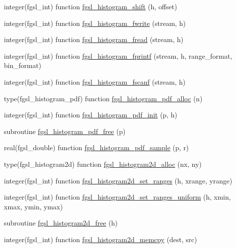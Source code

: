 \begin{DoxyCompactItemize}
\item 
integer(fgsl\+\_\+int) function \hyperlink{histogram_8finc_a9be390cc9127a6ad9c43f1174f6921a3}{fgsl\+\_\+histogram\+\_\+shift} (h, offset)
\item 
integer(fgsl\+\_\+int) function \hyperlink{histogram_8finc_a9cd60d2b4a8975dbc59173525df57213}{fgsl\+\_\+histogram\+\_\+fwrite} (stream, h)
\item 
integer(fgsl\+\_\+int) function \hyperlink{histogram_8finc_ad4d6685a3377f33f0d5696e20d567c11}{fgsl\+\_\+histogram\+\_\+fread} (stream, h)
\item 
integer(fgsl\+\_\+int) function \hyperlink{histogram_8finc_ac04324f86720d5a8fb31ff67add1b52e}{fgsl\+\_\+histogram\+\_\+fprintf} (stream, h, range\+\_\+format, bin\+\_\+format)
\item 
integer(fgsl\+\_\+int) function \hyperlink{histogram_8finc_aaaba1318d1c622c34f72afd75f57255c}{fgsl\+\_\+histogram\+\_\+fscanf} (stream, h)
\item 
type(fgsl\+\_\+histogram\+\_\+pdf) function \hyperlink{histogram_8finc_ac81a0323bfb973e3f0e8bd98c3acf6b8}{fgsl\+\_\+histogram\+\_\+pdf\+\_\+alloc} (n)
\item 
integer(fgsl\+\_\+int) function \hyperlink{histogram_8finc_a49d1a7fc4dec06f53bb7251385c14d0f}{fgsl\+\_\+histogram\+\_\+pdf\+\_\+init} (p, h)
\item 
subroutine \hyperlink{histogram_8finc_afcdb14cb3224ee516b50ecee1d2bc9af}{fgsl\+\_\+histogram\+\_\+pdf\+\_\+free} (p)
\item 
real(fgsl\+\_\+double) function \hyperlink{histogram_8finc_a6bfe5e29af3597cf776cc60d40950dbe}{fgsl\+\_\+histogram\+\_\+pdf\+\_\+sample} (p, r)
\item 
type(fgsl\+\_\+histogram2d) function \hyperlink{histogram_8finc_a58fa9efe4e0dd763ec4dae80d32248b8}{fgsl\+\_\+histogram2d\+\_\+alloc} (nx, ny)
\item 
integer(fgsl\+\_\+int) function \hyperlink{histogram_8finc_a0135cf665318da2218084c25533cc012}{fgsl\+\_\+histogram2d\+\_\+set\+\_\+ranges} (h, xrange, yrange)
\item 
integer(fgsl\+\_\+int) function \hyperlink{histogram_8finc_ae6a0e35aa839f06904e57a2dab500f4d}{fgsl\+\_\+histogram2d\+\_\+set\+\_\+ranges\+\_\+uniform} (h, xmin, xmax, ymin, ymax)
\item 
subroutine \hyperlink{histogram_8finc_a5ccc6ca92d7e8f566652b057ef620681}{fgsl\+\_\+histogram2d\+\_\+free} (h)
\item 
integer(fgsl\+\_\+int) function \hyperlink{histogram_8finc_ac856a8c737e7efa4fe4aed4e7741bf68}{fgsl\+\_\+histogram2d\+\_\+memcpy} (dest, src)

\end{DoxyCompactItemize}
